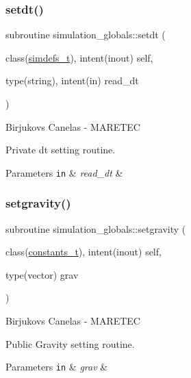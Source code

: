 \subsubsection{\texorpdfstring{setdt()}{setdt()}}
{\footnotesize\ttfamily subroutine simulation\+\_\+globals\+::setdt (\begin{DoxyParamCaption}\item[{class(\mbox{\hyperlink{structsimulation__globals_1_1simdefs__t}{simdefs\+\_\+t}}), intent(inout)}]{self,  }\item[{type(string), intent(in)}]{read\+\_\+dt }\end{DoxyParamCaption})\hspace{0.3cm}{\ttfamily [private]}}



Birjukovs Canelas -\/ M\+A\+R\+E\+T\+EC 

Private dt setting routine. 
\begin{DoxyParams}[1]{Parameters}
\mbox{\tt in}  & {\em read\+\_\+dt} & \\
\hline
\end{DoxyParams}
\mbox{\label{namespacesimulation__globals_ac655f60155581a71b312f3c1a8c87db2}} 
\subsubsection{\texorpdfstring{setgravity()}{setgravity()}}
{\footnotesize\ttfamily subroutine simulation\+\_\+globals\+::setgravity (\begin{DoxyParamCaption}\item[{class(\mbox{\hyperlink{structsimulation__globals_1_1constants__t}{constants\+\_\+t}}), intent(inout)}]{self,  }\item[{type(vector)}]{grav }\end{DoxyParamCaption})\hspace{0.3cm}{\ttfamily [private]}}



Birjukovs Canelas -\/ M\+A\+R\+E\+T\+EC 

Public Gravity setting routine. 
\begin{DoxyParams}[1]{Parameters}
\mbox{\tt in}  & {\em grav} & \\
\hline
\end{DoxyParams}
\mbox{\label{namespacesimulation__globals_aed3f671899558008ae9f0f009f581baf}} 
